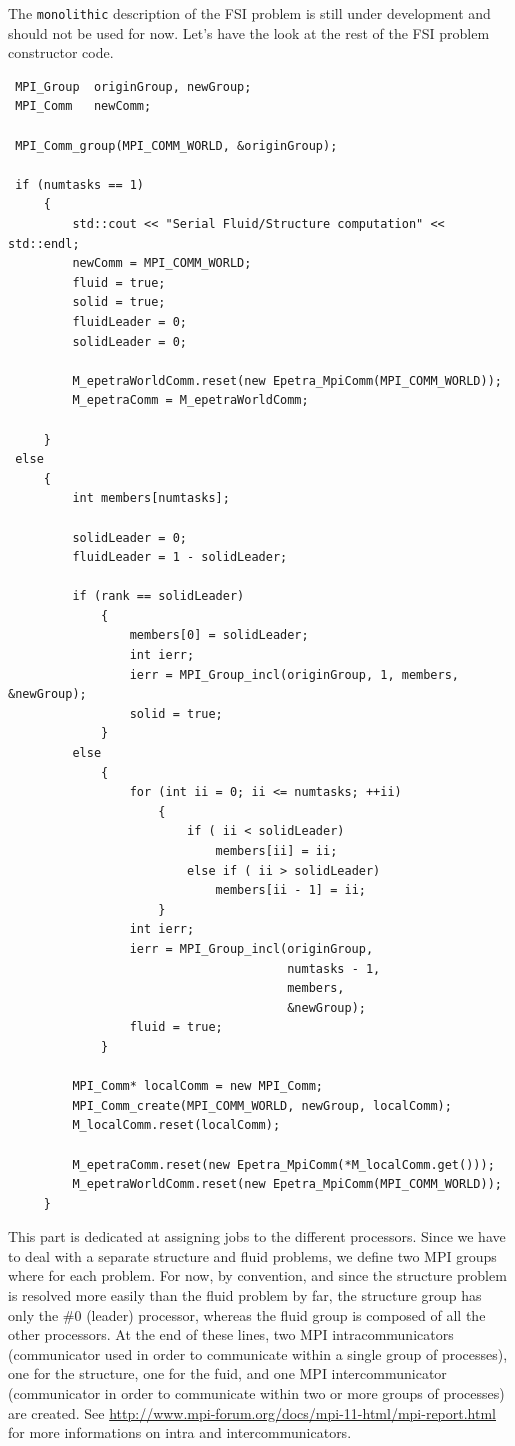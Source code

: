The \verb!monolithic! description of the FSI problem is still under  development and
should not be used for now. Let's have the look at the rest of the FSI problem constructor code.

\begin{verbatim}
 MPI_Group  originGroup, newGroup;
 MPI_Comm   newComm;

 MPI_Comm_group(MPI_COMM_WORLD, &originGroup);

 if (numtasks == 1)
     {
         std::cout << "Serial Fluid/Structure computation" << std::endl;
         newComm = MPI_COMM_WORLD;
         fluid = true;
         solid = true;
         fluidLeader = 0;
         solidLeader = 0;

         M_epetraWorldComm.reset(new Epetra_MpiComm(MPI_COMM_WORLD));
         M_epetraComm = M_epetraWorldComm;

     }
 else
     {
         int members[numtasks];

         solidLeader = 0;
         fluidLeader = 1 - solidLeader;

         if (rank == solidLeader)
             {
                 members[0] = solidLeader;
                 int ierr;
                 ierr = MPI_Group_incl(originGroup, 1, members, &newGroup);
                 solid = true;
             }
         else
             {
                 for (int ii = 0; ii <= numtasks; ++ii)
                     {
                         if ( ii < solidLeader)
                             members[ii] = ii;
                         else if ( ii > solidLeader)
                             members[ii - 1] = ii;
                     }
                 int ierr;
                 ierr = MPI_Group_incl(originGroup,
                                       numtasks - 1,
                                       members,
                                       &newGroup);
                 fluid = true;
             }

         MPI_Comm* localComm = new MPI_Comm;
         MPI_Comm_create(MPI_COMM_WORLD, newGroup, localComm);
         M_localComm.reset(localComm);

         M_epetraComm.reset(new Epetra_MpiComm(*M_localComm.get()));
         M_epetraWorldComm.reset(new Epetra_MpiComm(MPI_COMM_WORLD));
     }

\end{verbatim}

This part is dedicated at assigning jobs to the different processors. Since we have to deal
with a separate structure and fluid problems, we define two MPI groups where for each problem.
For now, by convention, and since the structure problem is resolved more easily than the
fluid problem by far, the structure group has only the \#0 (leader) processor, whereas the fluid group is
composed of all the other processors. At the end of these lines, two MPI intracommunicators
(communicator used in order to communicate within a single group of processes), one for the structure,
one for the fuid, and one MPI intercommunicator (communicator in order to communicate within two or
more groups of processes) are created. See \url{http://www.mpi-forum.org/docs/mpi-11-html/mpi-report.html}
for more informations on intra and intercommunicators.

